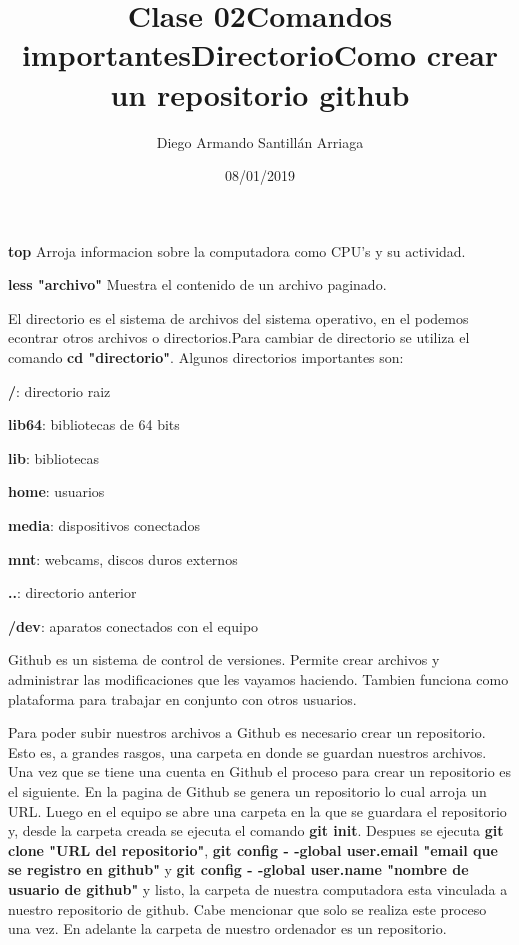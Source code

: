\documentclass[letter paper, 12pt, oneside]{article}
\title{\Huge Clase 02}
\author{Diego Armando Santillán Arriaga}
\date{08/01/2019}
\begin{document}
	\maketitle
\newpage
\title{\huge\textbf{Comandos importantes}}

\textbf{top} Arroja informacion sobre la computadora como CPU's y su actividad.

\textbf{less "archivo"} Muestra el contenido de un archivo paginado.


\title{\huge\textbf{Directorio}}


El directorio es el sistema de archivos del sistema operativo, en el podemos econtrar otros archivos o directorios.Para cambiar de directorio se utiliza el comando \textbf{cd "directorio"}. Algunos directorios importantes son:

\textbf{/}: directorio raiz


\textbf{lib64}: bibliotecas de 64 bits


\textbf{lib}: bibliotecas


\textbf{home}: usuarios


\textbf{media}: dispositivos conectados


\textbf{mnt}: webcams, discos duros externos


\textbf{..}: directorio anterior


\textbf{/dev}: aparatos conectados con el equipo

\title{\huge\textbf{Como crear un repositorio github}}


Github es un sistema de control de versiones. Permite crear archivos y administrar las modificaciones que les vayamos haciendo. Tambien funciona como plataforma para trabajar en conjunto con otros usuarios.

Para poder subir nuestros archivos a Github es necesario crear un repositorio. Esto es, a grandes rasgos, una carpeta en donde se guardan nuestros archivos. Una vez que se tiene una cuenta en Github el proceso para crear un repositorio es el siguiente. En la pagina de Github se genera un repositorio lo cual arroja un URL. Luego en el equipo se abre una carpeta en la que se guardara el repositorio y, desde la carpeta creada se ejecuta el comando \textbf{git init}. Despues se ejecuta \textbf{git clone "URL del repositorio"}, \textbf{git config - -global user.email "email que se registro en github"} y \textbf{git config - -global user.name "nombre de usuario de github"} y listo, la carpeta de nuestra computadora esta vinculada a nuestro repositorio de github. Cabe mencionar que solo se realiza este proceso una vez. En adelante la carpeta de nuestro ordenador es un repositorio.  
\end{document}
